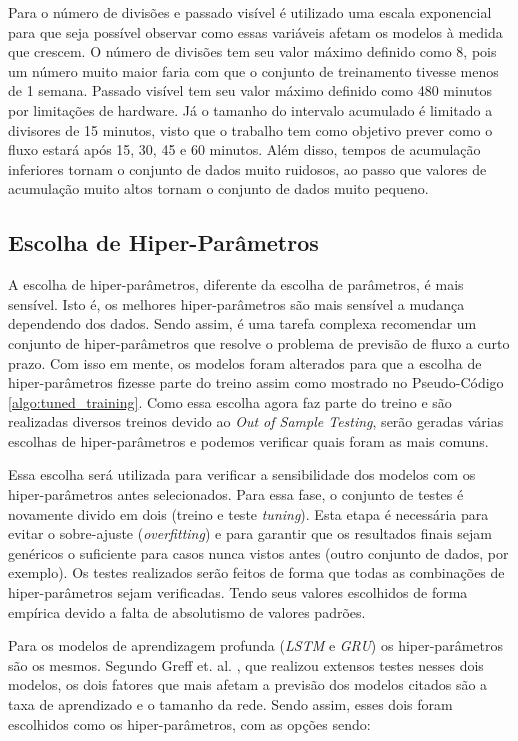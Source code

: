 Para o número de divisões e passado visível é utilizado uma escala exponencial para que seja possível observar como essas variáveis afetam os modelos à medida que crescem. O número de divisões tem seu valor máximo definido como 8, pois um número muito maior faria com que o conjunto de treinamento tivesse menos de 1 semana. Passado visível tem seu valor máximo definido como 480 minutos por limitações de hardware. Já o tamanho do intervalo acumulado é limitado a divisores de 15 minutos, visto que o trabalho tem como objetivo prever como o fluxo estará após 15, 30, 45 e 60 minutos. Além disso, tempos de acumulação inferiores tornam o conjunto de dados muito ruidosos, ao passo que valores de acumulação muito altos tornam o conjunto de dados muito pequeno.

\subsection{Escolha de Hiper-Parâmetros}

A escolha de hiper-parâmetros, diferente da escolha de parâmetros, é mais sensível. Isto é, os melhores hiper-parâmetros são mais sensível a mudança dependendo dos dados. Sendo assim, é uma tarefa complexa recomendar um conjunto de hiper-parâmetros que resolve o problema de previsão de fluxo a curto prazo. Com isso em mente, os modelos foram alterados para que a escolha de hiper-parâmetros fizesse parte do treino assim como mostrado no Pseudo-Código \ref{algo:tuned_training}. Como essa escolha agora faz parte do treino e são realizadas diversos treinos devido ao \textit{Out of Sample Testing}, serão geradas várias escolhas de hiper-parâmetros e podemos verificar quais foram as mais comuns.

Essa escolha será utilizada para verificar a sensibilidade dos modelos com os hiper-parâmetros antes selecionados. Para essa fase, o conjunto de testes é novamente divido em dois (treino e teste \textit{tuning}). Esta etapa é necessária para evitar o sobre-ajuste (\textit{overfitting}) e para garantir que os resultados finais sejam genéricos o suficiente para casos nunca vistos antes (outro conjunto de dados, por exemplo). Os testes realizados serão feitos de forma que todas as combinações de hiper-parâmetros sejam verificadas. Tendo seus valores escolhidos de forma empírica devido a falta de absolutismo de valores padrões.

Para os modelos de aprendizagem profunda (\textit{\acrshort{LSTM}} e \textit{\acrshort{GRU}}) os hiper-parâmetros são os mesmos. Segundo Greff et. al. \cite{Greff_2015}, que realizou extensos testes nesses dois modelos, os dois fatores que mais afetam a previsão dos modelos citados são a taxa de aprendizado e o tamanho da rede. Sendo assim, esses dois foram escolhidos como os hiper-parâmetros, com as opções sendo:

